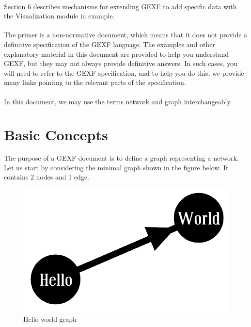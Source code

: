 \documentclass[a4paper,10pt]{article}
\begin{document}
\paragraph{}
Section 6 describes mechanisms for extending GEXF to add specific data with the Visualization module in example.

\paragraph{}
The primer is a non-normative document, which means that it does not provide a definitive specification of the GEXF language. The examples and other explanatory material in this document are provided to help you understand GEXF, but they may not always provide definitive answers. In such cases, you will need to refer to the GEXF specification, and to help you do this, we provide many links pointing to the relevant parts of the specification.

\paragraph{}
In this document, we may use the terms network and graph interchangeably.

\section{Basic Concepts} \label{basic}

The purpose of a GEXF document is to define a graph representing a network. Let us start by considering the minimal graph shown in the figure below. It contains 2 nodes and 1 edge.

\begin{figure}[!ht]
  \begin{center}
  \includegraphics[scale=0.15]{res/simple.png}
  \caption{Hello-world graph}
  \end{center}
\end{figure}
\end{document}

